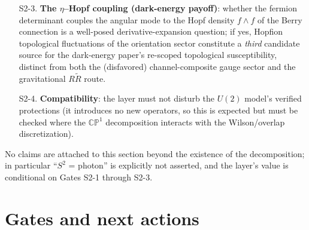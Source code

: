 \documentclass[11pt,a4paper]{article}
\begin{document}
\begin{enumerate}
(fit-leakage) $\kappa$ numbers of the July-8 run.  With the
corrected coefficient the relevant arithmetic runs the other way.
The same monopole-loop action that the companion paper's
dark-energy chain required, expressed through the measured
coefficient, is
\begin{equation}
S_{\rm mono} \;=\; 640\,\kappa_U \;=\; -\frac{85}{9\pi^2}
\;=\; -0.95 ,
\end{equation}
against a required window $[140, 550]$: the pre-registered
criterion fired, and the companion paper records the termination
of that chain.  The reading relevant \emph{here} is the physical
one and survives the sign: the substrate's quartic resistance to
orientation twisting is of ordinary one-loop (Gasser--Leutwyler)
strength, $|S_{\rm mono}| \sim 1$, so monopoles in this layer are
\emph{cheap} and topological events dense rather than
exponentially rare.  This sector supplies no diluteness of its
own; a Coulomb-phase claim would have to come from elsewhere.
All of which is, in the present state, \emph{moot}: the
Coulomb-versus-confined question presupposes a Maxwell term whose
sign is right, and S2-1 reports that at one loop it is not.  The
gate is suspended behind S2-1 rather than answered, and remains
stated so that it can fail.
\item[S2-3.] \textbf{The $\eta$--Hopf coupling (dark-energy
payoff)}: whether the fermion determinant couples the angular mode
to the Hopf density $f\wedge f$ of the Berry connection is a
well-posed derivative-expansion question; if yes, Hopfion
topological fluctuations of the orientation sector constitute a
\emph{third} candidate source for the dark-energy paper's
re-scoped topological susceptibility, distinct from both the
(disfavored) channel-composite gauge sector and the gravitational
$R\tilde R$ route.
\item[S2-4.] \textbf{Compatibility}: the layer must not disturb
the $U(2)$ model's verified protections (it introduces no new
operators, so this is expected but must be checked where the
$\mathbb{CP}^1$ decomposition interacts with the Wilson/overlap
discretization).
\end{enumerate}
No claims are attached to this section beyond the existence of the
decomposition; in particular ``$S^2$ = photon'' is explicitly not
asserted, and the layer's value is conditional on Gates S2-1
through S2-3.

\section{Gates and next actions}
\label{sec:gates}
\end{document}
